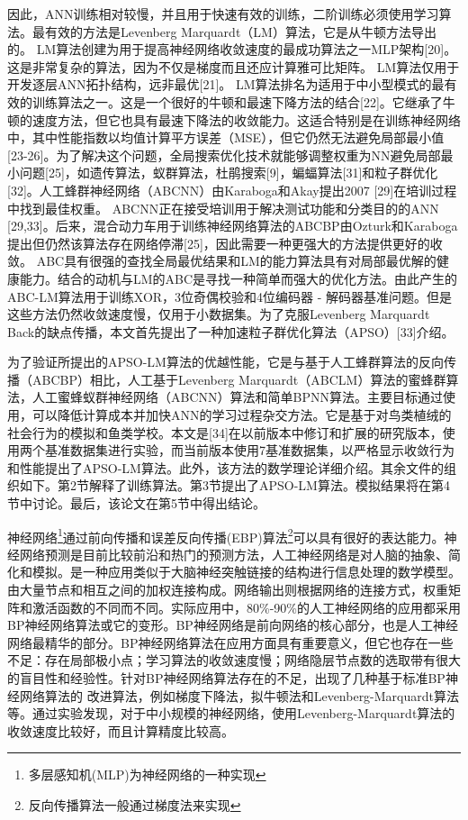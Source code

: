 因此，ANN训练相对较慢，并且用于快速有效的训练，二阶训练必须使用学习算法。最有效的方法是Levenberg Marquardt（LM）算法，它是从牛顿方法导出的。 LM算法创建为用于提高神经网络收敛速度的最成功算法之一MLP架构[20]。这是非常复杂的算法，因为不仅是梯度而且还应计算雅可比矩阵。 LM算法仅用于开发逐层ANN拓扑结构，远非最优[21]。 LM算法排名为适用于中小型模式的最有效的训练算法之一。这是一个很好的牛顿和最速下降方法的结合[22]。它继承了牛顿的速度方法，但它也具有最速下降法的收敛能力。这适合特别是在训练神经网络中，其中性能指数以均值计算平方误差（MSE），但它仍然无法避免局部最小值[23-26]。为了解决这个问题，全局搜索优化技术就能够调整权重为NN避免局部最小问题[25]，如遗传算法，蚁群算法，杜鹃搜索[9]，蝙蝠算法[31]和粒子群优化[32]。人工蜂群神经网络（ABCNN）由Karaboga和Akay提出2007 [29]在培训过程中找到最佳权重。 ABCNN正在接受培训用于解决测试功能和分类目的的ANN [29,33]。后来，混合动力车用于训练神经网络算法的ABCBP由Ozturk和Karaboga提出但仍然该算法存在网络停滞[25]，因此需要一种更强大的方法提供更好的收敛。 ABC具有很强的查找全局最优结果和LM的能力算法具有对局部最优解的健康能力。结合的动机与LM的ABC是寻找一种简单而强大的优化方法。由此产生的ABC-LM算法用于训练XOR，3位奇偶校验和4位编码器 - 解码器基准问题。但是这些方法仍然收敛速度慢，仅用于小数据集。为了克服Levenberg Marquardt Back的缺点传播，本文首先提出了一种加速粒子群优化算法（APSO）[33]介绍。


为了验证所提出的APSO-LM算法的优越性能，它是与基于人工蜂群算法的反向传播（ABCBP）相比，人工基于Levenberg Marquardt（ABCLM）算法的蜜蜂群算法，人工蜜蜂蚁群神经网络（ABCNN）算法和简单BPNN算法。主要目标通过使用，可以降低计算成本并加快ANN的学习过程杂交方法。它是基于对鸟类植绒的社会行为的模拟和鱼类学校。本文是[34]在以前版本中修订和扩展的研究版本，使用两个基准数据集进行实验，而当前版本使用7基准数据集，以严格显示收敛行为和性能提出了APSO-LM算法。此外，该方法的数学理论详细介绍。其余文件的组织如下。第2节解释了训练算法。第3节提出了APSO-LM算法。模拟结果将在第4节中讨论。最后，该论文在第5节中得出结论。


神经网络\footnote{多层感知机(MLP)为神经网络的一种实现}通过前向传播和误差反向传播(EBP)算法\footnote{反向传播算法一般通过梯度法来实现}可以具有很好的表达能力。神经网络预测是目前比较前沿和热门的预测方法，人工神经网络是对人脑的抽象、简化和模拟。是一种应用类似于大脑神经突触链接的结构进行信息处理的数学模型。由大量节点和相互之间的加权连接构成。网络输出则根据网络的连接方式，权重矩阵和激活函数的不同而不同。实际应用中，80\%-90\%的人工神经网络的应用都采用BP神经网络算法或它的变形。BP神经网络是前向网络的核心部分，也是人工神经网络最精华的部分。BP神经网络算法在应用方面具有重要意义，但它也存在一些不足：存在局部极小点；学习算法的收敛速度慢；网络隐层节点数的选取带有很大的盲目性和经验性。针对BP神经网络算法存在的不足，出现了几种基于标准BP神经网络算法的 改进算法，例如梯度下降法，拟牛顿法和Levenberg-Marquardt算法等。通过实验发现，对于中小规模的神经网络，使用Levenberg-Marquardt算法的收敛速度比较好，而且计算精度比较高。


